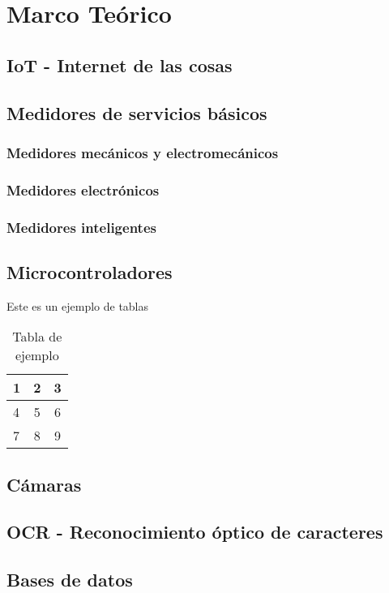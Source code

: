 \chapter{Marco Teórico}
\section{IoT - Internet de las cosas}

\section{Medidores de servicios básicos}
    \subsection{Medidores mecánicos y electromecánicos}
    \subsection{Medidores electrónicos}
    \subsection{Medidores inteligentes}
\section{Microcontroladores}
    Este es un ejemplo de tablas
    \begin{table}[ht!]
		\begin{center}
				\begin{tabular}{l c c}
			1 & 2 & 3 \\ \hline
			4 & 5 & 6\\
			7&8&9\\
		\end{tabular}	
		\end{center}

		\caption{Tabla de ejemplo}
	\end{table}
\section{Cámaras}
\section{OCR - Reconocimiento óptico de caracteres}
\section{Bases de datos}